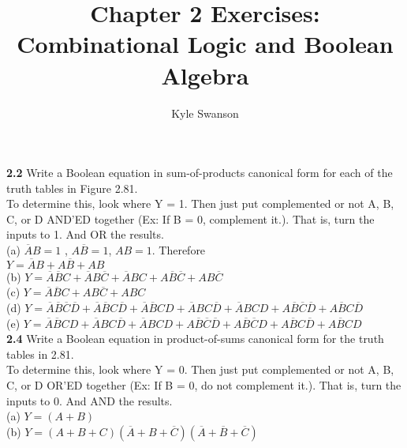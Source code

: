 \documentclass[12pt,a4paper]{report}
\author{Kyle Swanson}
\title{Chapter 2 Exercises: Combinational Logic and Boolean Algebra }
\begin{document}
\maketitle

\begin{normalsize}


\textbf{2.2} Write a Boolean equation in sum-of-products canonical form for each of the truth tables in Figure 2.81. \\

To determine this, look where Y = 1. Then just put complemented or not A, B, C, or D AND'ED together (Ex: If B = 0, complement it.). That is, turn the inputs to 1. And OR the results. \\

(a) $ \overline{A}B = 1 $ , $ A\overline{B} = 1 $, $ AB = 1 $. Therefore \\ 
$ Y = \overline{A}B + A\overline{B} + AB $ \\

(b) $ Y = \overline{A}\overline{B}C + \overline{A}B\overline{C} + \overline{A}BC + A\overline{B}\overline{C} + AB\overline{C}$ \\

(c) $ Y = \overline{A}\overline{B}C + AB\overline{C} + ABC $ \\

(d) $ Y = \overline{A}\overline{B}\overline{C}\overline{D} + \overline{A}\overline{B}C\overline{D} + \overline{A}\overline{B}CD + \overline{A}BC\overline{D} + \overline{A}BCD + A\overline{B}\overline{C}\overline{D} + A\overline{B}C\overline{D} $ \\

(e) $ Y = \overline{A}\overline{B}CD + \overline{A}BC\overline{D} + \overline{A}BCD + A\overline{B}\overline{C}\overline{D} + A\overline{B}\overline{C}D + A\overline{B}C\overline{D} + A\overline{B}CD $ \\

\textbf{2.4} Write a Boolean equation in product-of-sums canonical form for the truth tables in 2.81. \\

To determine this, look where Y = 0. Then just put complemented or not A, B, C, or D OR'ED together (Ex: If B = 0, do not complement it.). That is, turn the inputs to 0. And AND the results. \\

(a) $ Y = (A + B) $ \\

(b) $ Y = (A + B + C) (\overline{A} + B + \overline{C}) (\overline{A} + \overline{B} + \overline{C}) $ \\


\end{normalsize}
\end{document}

